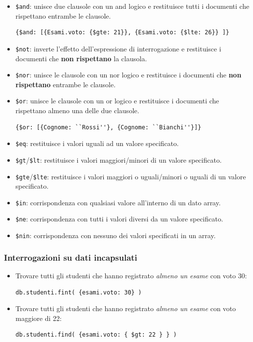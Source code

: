 \documentclass{report}
\begin{document}
\begin{itemize}
\item \texttt{\$and}: unisce due clausole con un and logico e restituisce tutti i documenti che rispettano entrambe le clausole.
\begin{lstlisting}
{$and: [{Esami.voto: {$gte: 21}}, {Esami.voto: {$lte: 26}} ]}
\end{lstlisting}
\item \texttt{\$not}: inverte l'effetto dell'espressione di interrogazione e restituisce i documenti che \textbf{non rispettano} la clausola.
\item \texttt{\$nor}: unisce le clausole con un nor logico e restituisce i documenti che \textbf{non rispettano} entrambe le clausole.
\item \texttt{\$or}: unisce le clausole con un or logico e restituisce i documenti che rispettano almeno una delle due clausole.
\begin{lstlisting}
{$or: [{Cognome: ``Rossi''}, {Cognome: ``Bianchi''}]}
\end{lstlisting}
\item \texttt{\$eq}: restituisce i valori uguali ad un valore specificato.
\item \texttt{\$gt}/\texttt{\$lt}: restituisce i valori maggiori/minori di un valore specificato.
\item \texttt{\$gte}/\texttt{\$lte}: restituisce i valori maggiori o uguali/minori o uguali di un valore specificato.
\item \texttt{\$in}: corrispondenza con qualsiasi valore all'interno di un dato array.
\item \texttt{\$ne}: corrispondenza con tutti i valori diversi da un valore specificato.
\item \texttt{\$nin}: corrispondenza con nessuno dei valori specificati in un array.
\end{itemize}

\subsubsection{Interrogazioni su dati incapsulati}

\begin{itemize}
\item Trovare tutti gli studenti che hanno registrato \emph{almeno un esame} con voto 30:
\begin{lstlisting}
db.studenti.fint( {esami.voto: 30} )
\end{lstlisting}
\item Trovare tutti gli studenti che hanno registrato \emph{almeno un esame} con voto maggiore di 22:
\begin{lstlisting}
db.studenti.find( {esami.voto: { $gt: 22 } } )
\end{lstlisting}
\end{itemize}
\end{document}
